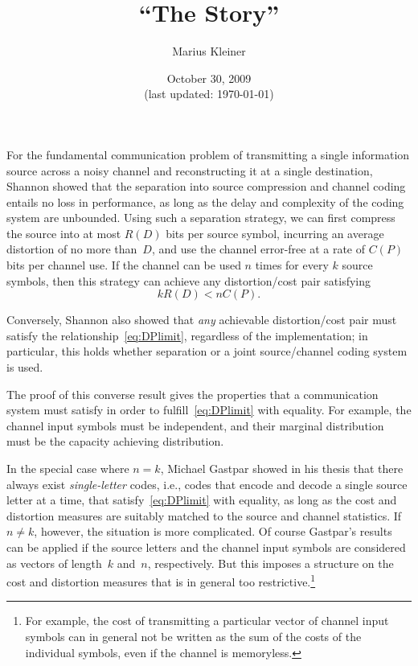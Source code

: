 \documentclass[a4paper]{article}
\title{``The Story''}
\author{Marius Kleiner}
\date{October 30, 2009\\\small(last updated: \today)}
\theoremstyle{definition}
\newcommand{\ie}{i.e.}
\begin{document}
\maketitle

\noindent
For the fundamental communication problem of transmitting a single information
source across a noisy channel and reconstructing it at a single destination,
Shannon showed that the separation into source compression and channel coding
entails no loss in performance, as long as the delay and complexity of the
coding system are unbounded. Using such a separation strategy, we can first
compress the source into at most $R(D)$ bits per source symbol, incurring an
average distortion of no more than~$D$, and use the channel error-free at a rate
of $C(P)$ bits per channel use. If the channel can be used $n$ times for every
$k$ source symbols, then this strategy can achieve any distortion/cost pair
satisfying
\begin{equation}
  \label{eq:DPlimit}
k R(D) < nC(P).
\end{equation}

Conversely, Shannon also showed that \emph{any} achievable distortion/cost pair
must satisfy the relationship~\eqref{eq:DPlimit}, regardless of the
implementation; in particular, this holds whether separation or a joint
source\slash channel coding system is used. 

The proof of this converse result gives the properties that a communication
system must satisfy in order to fulfill~\eqref{eq:DPlimit} with equality. For
example, the channel input symbols must be independent, and their marginal
distribution must be the capacity achieving distribution. 

In the special case where $n=k$, Michael Gastpar showed in his thesis that there
always exist \emph{single-letter} codes, \ie, codes that encode and decode a
single source letter at a time, that satisfy~\eqref{eq:DPlimit} with equality,
as long as the cost and distortion measures are suitably matched to the source
and channel statistics. If $n \ne k$, however, the situation is more
complicated. Of course Gastpar's results can be applied if the source letters
and the channel input symbols are considered as vectors of length~$k$ and~$n$,
respectively. But this imposes a structure on the cost and distortion measures
that is in general too restrictive.\footnote{For example, the cost of
transmitting a particular vector of channel input symbols can in general not be
written as the sum of the costs of the individual symbols, even if the channel
is memoryless.}
\end{document}
